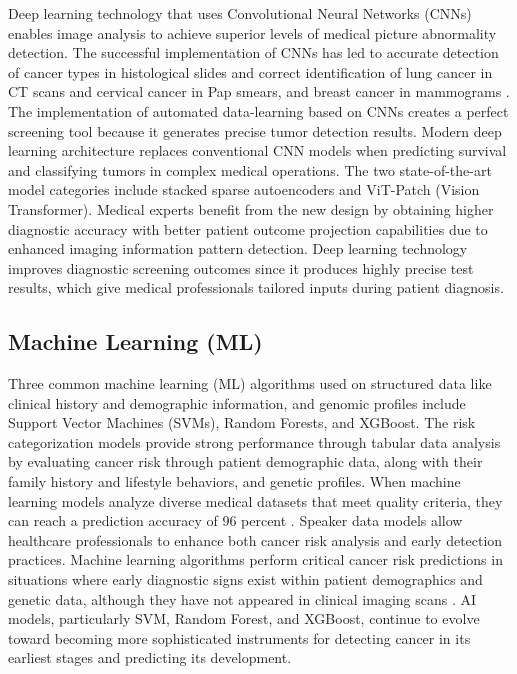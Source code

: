 \documentclass[conference]{IEEEtran}
\begin{document}
Deep learning technology that uses Convolutional Neural Networks (CNNs) enables image analysis to achieve superior levels of medical picture abnormality detection. The successful implementation of CNNs has led to accurate detection of cancer types in histological slides and correct identification of lung cancer in CT scans and cervical cancer in Pap smears, and breast cancer in mammograms \cite{33}. The implementation of automated data-learning based on CNNs creates a perfect screening tool because it generates precise tumor detection results. Modern deep learning architecture replaces conventional CNN models when predicting survival and classifying tumors in complex medical operations. The two state-of-the-art model categories include stacked sparse autoencoders and ViT-Patch (Vision Transformer)\cite{27}. Medical experts benefit from the new design by obtaining higher diagnostic accuracy with better patient outcome projection capabilities due to enhanced imaging information pattern detection. Deep learning technology improves diagnostic screening outcomes since it produces highly precise test results, which give medical professionals tailored inputs during patient diagnosis\cite{30}.

\subsection{Machine Learning (ML)}

Three common machine learning (ML) algorithms used on structured data like clinical history and demographic information, and genomic profiles include Support Vector Machines (SVMs), Random Forests, and XGBoost. The risk categorization models provide strong performance through tabular data analysis by evaluating cancer risk through patient demographic data, along with their family history and lifestyle behaviors, and genetic profiles\cite{31}. When machine learning models analyze diverse medical datasets that meet quality criteria, they can reach a prediction accuracy of 96 percent . Speaker data models allow healthcare professionals to enhance both cancer risk analysis and early detection practices. Machine learning algorithms perform critical cancer risk predictions in situations where early diagnostic signs exist within patient demographics and genetic data, although they have not appeared in clinical imaging scans \cite{35}. AI models, particularly SVM, Random Forest, and XGBoost, continue to evolve toward becoming more sophisticated instruments for detecting cancer in its earliest stages and predicting its development.
\end{document}

